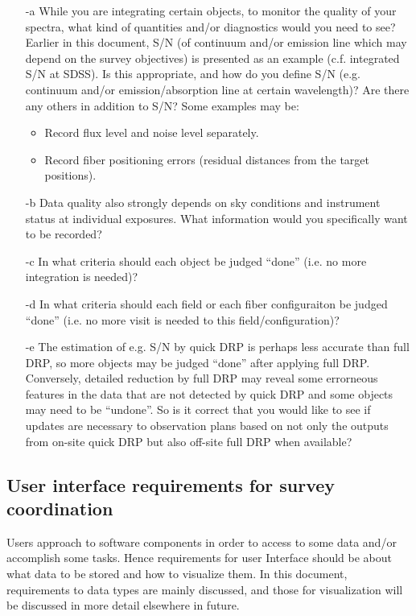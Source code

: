 \documentclass[a4paper,notitlepage]{article}
\newcommand{\coll}[1]{\textcolor{ccoll}{\thesubsubsection-#1}}
\begin{document}
\begin{enumerate}
 \item[\coll{a}] While you are integrating certain objects, to monitor the
      quality of your spectra, what kind of quantities and/or
      diagnostics would you need to see? Earlier in this document,
      S/N (of continuum and/or emission line which may depend on the
      survey objectives) is presented as an example (c.f. integrated
      S/N at SDSS). Is this appropriate, and how do you define S/N 
      (e.g. continuum and/or emission/absorption line at certain wavelength)? 
      Are there any others in
      addition to S/N? Some examples may be:
      \begin{itemize}
       \item Record flux level and noise level separately.
       \item Record fiber positioning errors (residual distances
         from the target positions).
      \end{itemize}
 \item[\coll{b}] Data quality also strongly depends on sky conditions and
      instrument status at individual exposures. What information
      would you specifically want to be recorded?
 \item[\coll{c}] In what criteria should each object be judged ``done''
      (i.e. no more integration is needed)?
 \item[\coll{d}] In what criteria should each field or each fiber configuraiton
      be judged ``done'' (i.e. no more visit is needed to this
      field/configuration)?
 \item[\coll{e}] The estimation of e.g. S/N by quick DRP is perhaps less
      accurate than full DRP, so more objects may be judged ``done''
      after applying full DRP. Conversely, detailed reduction by
      full DRP may reveal some errorneous features in the data that
      are not detected by quick DRP and some objects may need to be
      ``undone''. So is it correct that you would like to see if
      updates are necessary to observation plans based on not only
      the outputs from on-site quick DRP but also off-site full DRP
      when available?
\end{enumerate}

\subsection{User interface requirements for survey coordination}

Users approach to software components in order to access to some data
and/or accomplish some tasks. Hence requirements for user Interface
should be about what data to be stored and how to visualize them.
In this document, requirements to data types are mainly discussed, and
those for visualization will be discussed in more detail elsewhere in
future.
\end{document}
